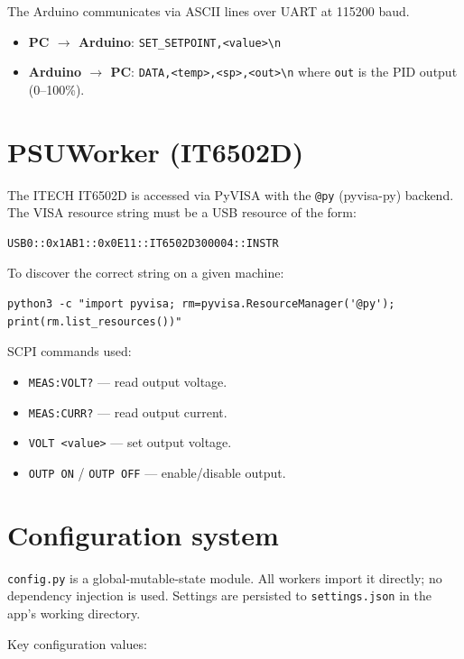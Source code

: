 \documentclass[12pt, a4paper]{report}
\begin{document}
The Arduino communicates via ASCII lines over UART at 115200 baud.

\begin{itemize}
  \item \textbf{PC $\rightarrow$ Arduino}: \texttt{SET\_SETPOINT,<value>\textbackslash n}
  \item \textbf{Arduino $\rightarrow$ PC}: \texttt{DATA,<temp>,<sp>,<out>\textbackslash n}
        where \texttt{out} is the PID output (0--100\%).
\end{itemize}

\section{PSUWorker (IT6502D)}

The ITECH IT6502D is accessed via PyVISA with the \texttt{@py} (pyvisa-py) backend.
The VISA resource string must be a USB resource of the form:
\begin{lstlisting}[style=shell]
USB0::0x1AB1::0x0E11::IT6502D300004::INSTR
\end{lstlisting}

To discover the correct string on a given machine:
\begin{lstlisting}[style=shell]
python3 -c "import pyvisa; rm=pyvisa.ResourceManager('@py'); print(rm.list_resources())"
\end{lstlisting}

SCPI commands used:
\begin{itemize}
  \item \texttt{MEAS:VOLT?} --- read output voltage.
  \item \texttt{MEAS:CURR?} --- read output current.
  \item \texttt{VOLT <value>} --- set output voltage.
  \item \texttt{OUTP ON} / \texttt{OUTP OFF} --- enable/disable output.
\end{itemize}

\section{Configuration system}

\texttt{config.py} is a global-mutable-state module. All workers import it directly;
no dependency injection is used. Settings are persisted to \texttt{settings.json}
in the app's working directory.

Key configuration values:
\end{document}
